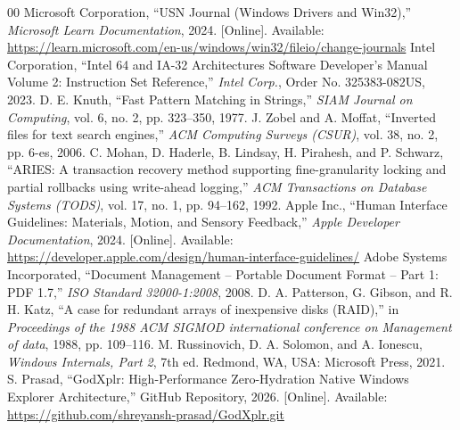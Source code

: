 \documentclass[conference]{IEEEtran}
\begin{document}
\begin{thebibliography}{00}
 Microsoft Corporation, ``USN Journal (Windows Drivers and Win32),'' \textit{Microsoft Learn Documentation}, 2024. [Online]. Available: \url{https://learn.microsoft.com/en-us/windows/win32/fileio/change-journals}
 Intel Corporation, ``Intel 64 and IA-32 Architectures Software Developer's Manual Volume 2: Instruction Set Reference,'' \textit{Intel Corp.}, Order No. 325383-082US, 2023.
 D. E. Knuth, ``Fast Pattern Matching in Strings,'' \textit{SIAM Journal on Computing}, vol. 6, no. 2, pp. 323--350, 1977.
 J. Zobel and A. Moffat, ``Inverted files for text search engines,'' \textit{ACM Computing Surveys (CSUR)}, vol. 38, no. 2, pp. 6-es, 2006.
 C. Mohan, D. Haderle, B. Lindsay, H. Pirahesh, and P. Schwarz, ``ARIES: A transaction recovery method supporting fine-granularity locking and partial rollbacks using write-ahead logging,'' \textit{ACM Transactions on Database Systems (TODS)}, vol. 17, no. 1, pp. 94--162, 1992.
 Apple Inc., ``Human Interface Guidelines: Materials, Motion, and Sensory Feedback,'' \textit{Apple Developer Documentation}, 2024. [Online]. Available: \url{https://developer.apple.com/design/human-interface-guidelines/}
 Adobe Systems Incorporated, ``Document Management -- Portable Document Format -- Part 1: PDF 1.7,'' \textit{ISO Standard 32000-1:2008}, 2008.
 D. A. Patterson, G. Gibson, and R. H. Katz, ``A case for redundant arrays of inexpensive disks (RAID),'' in \textit{Proceedings of the 1988 ACM SIGMOD international conference on Management of data}, 1988, pp. 109--116.
 M. Russinovich, D. A. Solomon, and A. Ionescu, \textit{Windows Internals, Part 2}, 7th ed. Redmond, WA, USA: Microsoft Press, 2021.
 S. Prasad, ``GodXplr: High-Performance Zero-Hydration Native Windows Explorer Architecture,'' GitHub Repository, 2026. [Online]. Available: \url{https://github.com/shreyansh-prasad/GodXplr.git}
\end{thebibliography}
\end{document}

